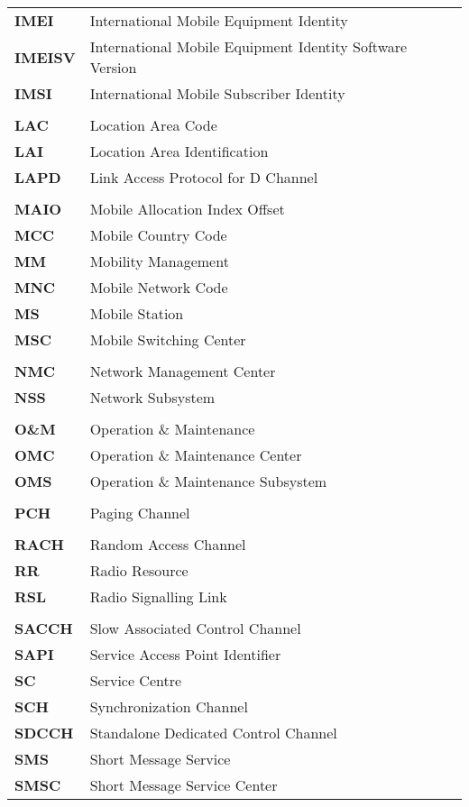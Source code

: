 \documentclass[documentation]{subfiles}
\begin{document}
\begin{longtable}{>{\bf}ll}
    IMEI    & International Mobile Equipment Identity\\
    IMEISV  & International Mobile Equipment Identity Software Version\\
    IMSI    & International Mobile Subscriber Identity\\
    \\
    LAC     & Location Area Code\\
    LAI     & Location Area Identification\\
    LAPD    & Link Access Protocol for D Channel\\
    \\
    MAIO    & Mobile Allocation Index Offset\\
    MCC     & Mobile Country Code\\
    MM      & Mobility Management\\
    MNC     & Mobile Network Code\\
    MS      & Mobile Station\\
    MSC     & Mobile Switching Center\\
    \\
    NMC     & Network Management Center\\
    NSS     & Network Subsystem\\
    \\
    O\&M    & Operation \& Maintenance\\
    OMC     & Operation \& Maintenance Center\\
    OMS     & Operation \& Maintenance Subsystem\\
    \\
    PCH     & Paging Channel\\
    \\
    RACH    & Random Access Channel\\
    RR      & Radio Resource\\
    RSL     & Radio Signalling Link\\
    \\
    SACCH   & Slow Associated Control Channel\\
    SAPI    & Service Access Point Identifier\\
    SC      & Service Centre\\
    SCH     & Synchronization Channel\\
    SDCCH   & Standalone Dedicated Control Channel\\
    SMS     & Short Message Service\\
    SMSC    & Short Message Service Center\\

\end{longtable}
\end{document}
